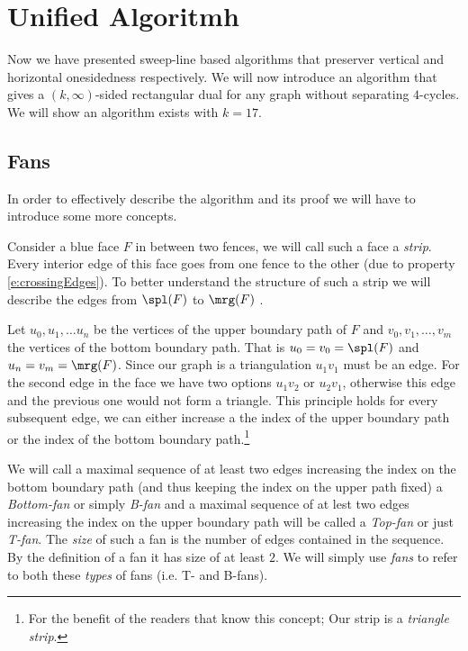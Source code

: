 
\newenvironment{invariants}{%
  \refstepcounter{thrm}%
  \mypar{Invariants~\theprop}%
  \renewcommand*{\theenumi}{\theprop\,(I\arabic{enumi})}%
  \renewcommand*{\labelenumi}{(I\arabic{enumi})}%
  \enumerate
}{%
  \endenumerate
}

\section{Unified Algoritmh}

Now we have presented sweep-line based algorithms that preserver vertical and horizontal onesidedness respectively. We will now introduce an algorithm that gives a $(k,\infty)$-sided rectangular dual for any graph without separating $4$-cycles. We will show an algorithm exists with $k=17$.


 \subsection{Fans}
 In order to effectively describe the algorithm and its proof we will have to introduce some more concepts.

 Consider a blue face $F$ in between two fences, we will call such a face a \emph{strip}. Every interior edge of this face goes from one fence to the other (due to property \ref{e:crossingEdges}). To better understand the structure of such a strip we will describe the edges from $\spl(F)$ to $\mrg(F)$ .

 Let $u_0 , u_1, \ldots u_n$ be the vertices of the upper boundary path of $F$ and $v_0, v_1, \ldots, v_m$ the vertices of the bottom boundary path. That is $u_0=v_0 = \spl(F)$ and $u_n = v_m = \mrg(F)$. Since our graph is a triangulation $u_1v_1$ must be an edge. For the second edge in the face we have two options $u_1v_2$ or $u_2v_1$, otherwise this edge and the previous one would not form a triangle. This principle holds for every subsequent edge, we can either increase a the index of the upper boundary path or the index of the bottom boundary path.\footnote{For the benefit of the readers that know this concept; Our strip is a \emph{triangle strip}.}

 We will call a maximal sequence of at least two edges increasing the index on the bottom boundary path (and thus keeping the index on the upper path fixed) a \emph{Bottom-fan} or simply \emph{B-fan} and a maximal sequence of at lest two edges increasing the index on the upper boundary path will be called a \emph{Top-fan} or just \emph{T-fan}. The \emph{size} of such a fan is the number of edges contained in the sequence. By the definition of a fan it has size of at least $2$.
  We will simply use \emph{fans} to refer to both these \emph{types} of fans (i.e. T- and B-fans).

